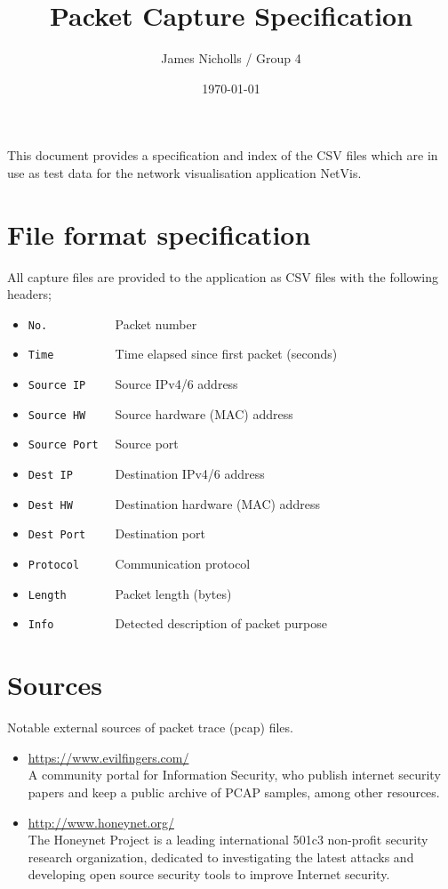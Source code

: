 \documentclass[12pt,a4paper]{article}
\author{James Nicholls / Group 4}
\title{Packet Capture Specification}
\date{\today}
\begin{document}
    \maketitle

    This document provides a specification and index of the CSV files
    which are in use as test data for the network visualisation
    application NetVis.

    \section{File format specification}
        All capture files are provided to the application as CSV files
        with the following headers;

    \begin{itemize}
    \setlength{\itemsep}{0pt}
        \item \verb!No.          ! Packet number
        \item \verb!Time         ! Time elapsed since first packet (seconds)
        \item \verb!Source IP    ! Source IPv4/6 address
        \item \verb!Source HW    ! Source hardware (MAC) address
        \item \verb!Source Port  ! Source port
        \item \verb!Dest IP      ! Destination IPv4/6 address
        \item \verb!Dest HW      ! Destination hardware (MAC) address
        \item \verb!Dest Port    ! Destination port
        \item \verb!Protocol     ! Communication protocol
        \item \verb!Length       ! Packet length (bytes)
        \item \verb!Info         ! Detected description of packet purpose
    \end{itemize}

    \section{Sources}

    Notable external sources of packet trace (pcap) files.

    \begin{itemize}
        \item \url{https://www.evilfingers.com/} \\
            A community portal for Information Security, who publish
            internet security papers and keep a public archive of
            PCAP samples, among other resources.

        \item \url{http://www.honeynet.org/} \\
            The Honeynet Project is a leading international 501c3
            non-profit security research organization, dedicated to
            investigating the latest attacks and developing open source
            security tools to improve Internet security.
    \end{itemize}
\end{document}
